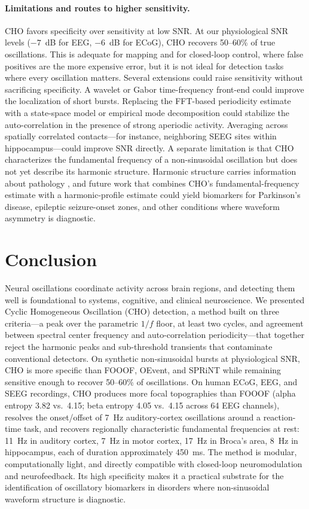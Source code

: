 \documentclass[11pt]{article}
\begin{document}
\paragraph{Limitations and routes to higher sensitivity.}
CHO favors specificity over sensitivity at low SNR. At our physiological SNR levels ($-7$~dB for EEG, $-6$~dB for ECoG), CHO recovers 50--60\% of true oscillations. This is adequate for mapping and for closed-loop control, where false positives are the more expensive error, but it is not ideal for detection tasks where every oscillation matters. Several extensions could raise sensitivity without sacrificing specificity. A wavelet or Gabor time-frequency front-end could improve the localization of short bursts. Replacing the FFT-based periodicity estimate with a state-space model or empirical mode decomposition \citep{quinn2021within} could stabilize the auto-correlation in the presence of strong aperiodic activity. Averaging across spatially correlated contacts---for instance, neighboring SEEG sites within hippocampus---could improve SNR directly. A separate limitation is that CHO characterizes the fundamental frequency of a non-sinusoidal oscillation but does not yet describe its harmonic structure. Harmonic structure carries information about pathology \citep{cole2017waveform}, and future work that combines CHO's fundamental-frequency estimate with a harmonic-profile estimate could yield biomarkers for Parkinson's disease, epileptic seizure-onset zones, and other conditions where waveform asymmetry is diagnostic.

\section{Conclusion}

Neural oscillations coordinate activity across brain regions, and detecting them well is foundational to systems, cognitive, and clinical neuroscience. We presented Cyclic Homogeneous Oscillation (CHO) detection, a method built on three criteria---a peak over the parametric $1/f$ floor, at least two cycles, and agreement between spectral center frequency and auto-correlation periodicity---that together reject the harmonic peaks and sub-threshold transients that contaminate conventional detectors. On synthetic non-sinusoidal bursts at physiological SNR, CHO is more specific than FOOOF, OEvent, and SPRiNT while remaining sensitive enough to recover 50--60\% of oscillations. On human ECoG, EEG, and SEEG recordings, CHO produces more focal topographies than FOOOF (alpha entropy 3.82 vs.~4.15; beta entropy 4.05 vs.~4.15 across 64 EEG channels), resolves the onset/offset of 7~Hz auditory-cortex oscillations around a reaction-time task, and recovers regionally characteristic fundamental frequencies at rest: 11~Hz in auditory cortex, 7~Hz in motor cortex, 17~Hz in Broca's area, 8~Hz in hippocampus, each of duration approximately 450~ms. The method is modular, computationally light, and directly compatible with closed-loop neuromodulation and neurofeedback. Its high specificity makes it a practical substrate for the identification of oscillatory biomarkers in disorders where non-sinusoidal waveform structure is diagnostic.


\end{document}
